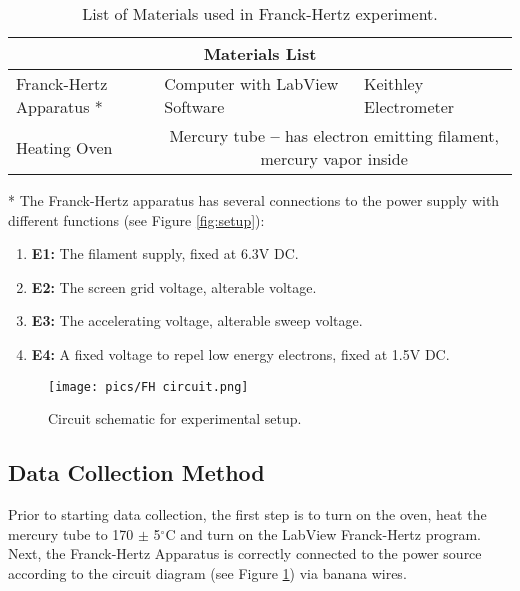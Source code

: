 \documentclass[12pt, letterpaper, twoside]{article}
\begin{document}
\begin{table}[!ht]
    \centering
        \begin{tabular}{|p{2.4cm}|p{5cm}|p{4cm}|}
            \multicolumn{3}{c}{\textbf{Materials List}}\\
            \hline
            Franck-Hertz Apparatus * & Computer with LabView Software & Keithley Electrometer \\
            \hline
            Heating Oven & \multicolumn{2}{c|}{Mercury tube \textbf{--} has electron emitting filament, mercury vapor inside}\\
            \hline
        \end{tabular}
        \caption{List of Materials used in Franck-Hertz experiment.}
        \label{tab:materials}
\end{table}
\vfill\pagebreak

\begin{small}
    * The Franck-Hertz apparatus has several connections to the power supply with different functions (see Figure \ref{fig:setup}):
    \begin{enumerate}
        \item \textbf{E1:} The filament supply, fixed at 6.3V DC.
        \item \textbf{E2:} The screen grid voltage, alterable voltage.
        \item \textbf{E3:} The accelerating voltage, alterable sweep voltage.
        \item \textbf{E4:} A fixed voltage to repel low energy electrons, fixed at 1.5V DC.
    \end{enumerate}
\end{small}

\begin{figure}[!ht]
    \centering
    \texttt{[image: pics/FH circuit.png]}
    \caption{Circuit schematic for experimental setup.}
    \label{fig:circuit}
\end{figure}

\subsection{Data Collection Method}
Prior to starting data collection, the first step is to turn on the oven, heat the mercury tube to 170 $\pm$ 5$^{\circ}$C and turn on the LabView Franck-Hertz program. Next, the Franck-Hertz Apparatus is correctly connected to the power source according to the circuit diagram (see Figure \ref{fig:circuit}) via banana wires. 
\end{document}
